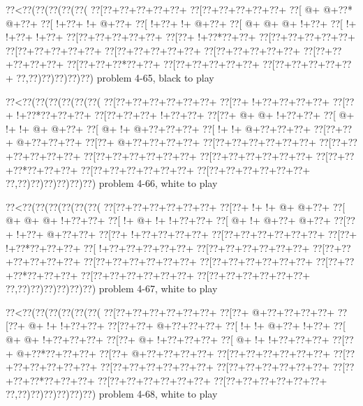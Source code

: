 \vbox{\vbox{\goo
\0??<\0??(\0??(\0??(\0??(\0??(
\0??[\0??+\0??+\0??+\0??+\0??+
\0??[\0??+\0??+\0??+\0??+\0??+
\0??[\- @+\- @+\0??*\- @+\0??+
\0??[\- !+\0??+\- !+\- @+\0??+
\0??[\- !+\0??+\- !+\- @+\0??+
\0??[\- @+\- @+\- @+\- !+\0??+
\0??[\- !+\- !+\0??+\- !+\0??+
\0??[\0??+\0??+\0??+\0??+\0??+
\0??[\0??+\- !+\0??*\0??+\0??+
\0??[\0??+\0??+\0??+\0??+\0??+
\0??[\0??+\0??+\0??+\0??+\0??+
\0??[\0??+\0??+\0??+\0??+\0??+
\0??[\0??+\0??+\0??+\0??+\0??+
\0??[\0??+\0??+\0??+\0??+\0??+
\0??[\0??+\0??+\0??*\0??+\0??+
\0??[\0??+\0??+\0??+\0??+\0??+
\0??[\0??+\0??+\0??+\0??+\0??+
\0??,\0??)\0??)\0??)\0??)\0??)
}
\hfil problem 4-65, black to play\hfil\break
}

\vbox{\vbox{\goo
\0??<\0??(\0??(\0??(\0??(\0??(\0??(
\0??[\0??+\0??+\0??+\0??+\0??+\0??+
\0??[\0??+\- !+\0??+\0??+\0??+\0??+
\0??[\0??+\- !+\0??*\0??+\0??+\0??+
\0??[\0??+\0??+\0??+\- !+\0??+\0??+
\0??[\0??+\- @+\- @+\- !+\0??+\0??+
\0??[\- @+\- !+\- !+\- @+\- @+\0??+
\0??[\- @+\- !+\- @+\0??+\0??+\0??+
\0??[\- !+\- !+\- @+\0??+\0??+\0??+
\0??[\0??+\0??+\- @+\0??+\0??+\0??+
\0??[\0??+\- @+\0??+\0??+\0??+\0??+
\0??[\0??+\0??+\0??+\0??+\0??+\0??+
\0??[\0??+\0??+\0??+\0??+\0??+\0??+
\0??[\0??+\0??+\0??+\0??+\0??+\0??+
\0??[\0??+\0??+\0??+\0??+\0??+\0??+
\0??[\0??+\0??+\0??*\0??+\0??+\0??+
\0??[\0??+\0??+\0??+\0??+\0??+\0??+
\0??[\0??+\0??+\0??+\0??+\0??+\0??+
\0??,\0??)\0??)\0??)\0??)\0??)\0??)
}
\hfil problem 4-66, white to play\hfil\break
}

\vbox{\vbox{\goo
\0??<\0??(\0??(\0??(\0??(\0??(\0??(
\0??[\0??+\0??+\0??+\0??+\0??+\0??+
\0??[\0??+\- !+\- !+\- @+\- @+\0??+
\0??[\- @+\- @+\- @+\- !+\0??+\0??+
\0??[\- !+\- @+\- !+\- !+\0??+\0??+
\0??[\- @+\- !+\- @+\0??+\- @+\0??+
\0??[\0??+\- !+\0??+\- @+\0??+\0??+
\0??[\0??+\- !+\0??+\0??+\0??+\0??+
\0??[\0??+\0??+\0??+\0??+\0??+\0??+
\0??[\0??+\- !+\0??*\0??+\0??+\0??+
\0??[\- !+\0??+\0??+\0??+\0??+\0??+
\0??[\0??+\0??+\0??+\0??+\0??+\0??+
\0??[\0??+\0??+\0??+\0??+\0??+\0??+
\0??[\0??+\0??+\0??+\0??+\0??+\0??+
\0??[\0??+\0??+\0??+\0??+\0??+\0??+
\0??[\0??+\0??+\0??*\0??+\0??+\0??+
\0??[\0??+\0??+\0??+\0??+\0??+\0??+
\0??[\0??+\0??+\0??+\0??+\0??+\0??+
\0??,\0??)\0??)\0??)\0??)\0??)\0??)
}
\hfil problem 4-67, white to play\hfil\break
}

\vbox{\vbox{\goo
\0??<\0??(\0??(\0??(\0??(\0??(\0??(
\0??[\0??+\0??+\0??+\0??+\0??+\0??+
\0??[\0??+\- @+\0??+\0??+\0??+\0??+
\0??[\0??+\- @+\- !+\- !+\0??+\0??+
\0??[\0??+\0??+\- @+\0??+\0??+\0??+
\0??[\- !+\- !+\- @+\0??+\- !+\0??+
\0??[\- @+\- @+\- !+\0??+\0??+\0??+
\0??[\0??+\- @+\- !+\0??+\0??+\0??+
\0??[\- @+\- !+\- !+\0??+\0??+\0??+
\0??[\0??+\- @+\0??*\0??+\0??+\0??+
\0??[\0??+\- @+\0??+\0??+\0??+\0??+
\0??[\0??+\0??+\0??+\0??+\0??+\0??+
\0??[\0??+\0??+\0??+\0??+\0??+\0??+
\0??[\0??+\0??+\0??+\0??+\0??+\0??+
\0??[\0??+\0??+\0??+\0??+\0??+\0??+
\0??[\0??+\0??+\0??*\0??+\0??+\0??+
\0??[\0??+\0??+\0??+\0??+\0??+\0??+
\0??[\0??+\0??+\0??+\0??+\0??+\0??+
\0??,\0??)\0??)\0??)\0??)\0??)\0??)
}
\hfil problem 4-68, white to play\hfil\break
}

